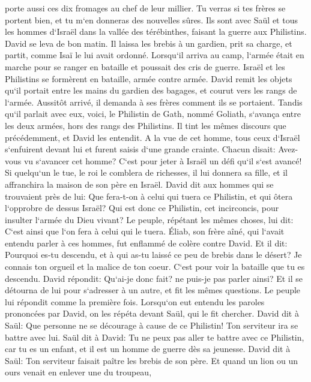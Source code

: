 \verse porte aussi ces dix fromages au chef de leur millier. Tu verras si tes frères se portent bien, et tu m`en donneras des nouvelles sûres. 
\verse Ils sont avec Saül et tous les hommes d`Israël dans la vallée des térébinthes, faisant la guerre aux Philistins. 
\verse David se leva de bon matin. Il laissa les brebis à un gardien, prit sa charge, et partit, comme Isaï le lui avait ordonné. Lorsqu`il arriva au camp, l`armée était en marche pour se ranger en bataille et poussait des cris de guerre. 
\verse Israël et les Philistins se formèrent en bataille, armée contre armée. 
\verse David remit les objets qu`il portait entre les mains du gardien des bagages, et courut vers les rangs de l`armée. Aussitôt arrivé, il demanda à ses frères comment ils se portaient. 
\verse Tandis qu`il parlait avec eux, voici, le Philistin de Gath, nommé Goliath, s`avança entre les deux armées, hors des rangs des Philistins. Il tint les mêmes discours que précédemment, et David les entendit. 
\verse A la vue de cet homme, tous ceux d`Israël s`enfuirent devant lui et furent saisis d`une grande crainte. 
\verse Chacun disait: Avez-vous vu s`avancer cet homme? C`est pour jeter à Israël un défi qu`il s`est avancé! Si quelqu`un le tue, le roi le comblera de richesses, il lui donnera sa fille, et il affranchira la maison de son père en Israël. 
\verse David dit aux hommes qui se trouvaient près de lui: Que fera-t-on à celui qui tuera ce Philistin, et qui ôtera l`opprobre de dessus Israël? Qui est donc ce Philistin, cet incirconcis, pour insulter l`armée du Dieu vivant? 
\verse Le peuple, répétant les mêmes choses, lui dit: C`est ainsi que l`on fera à celui qui le tuera. 
\verse Éliab, son frère aîné, qui l`avait entendu parler à ces hommes, fut enflammé de colère contre David. Et il dit: Pourquoi es-tu descendu, et à qui as-tu laissé ce peu de brebis dans le désert? Je connais ton orgueil et la malice de ton coeur. C`est pour voir la bataille que tu es descendu. 
\verse David répondit: Qu`ai-je donc fait? ne puis-je pas parler ainsi? 
\verse Et il se détourna de lui pour s`adresser à un autre, et fit les mêmes questions. Le peuple lui répondit comme la première fois. 
\verse Lorsqu`on eut entendu les paroles prononcées par David, on les répéta devant Saül, qui le fit chercher. 
\verse David dit à Saül: Que personne ne se décourage à cause de ce Philistin! Ton serviteur ira se battre avec lui. 
\verse Saül dit à David: Tu ne peux pas aller te battre avec ce Philistin, car tu es un enfant, et il est un homme de guerre dès sa jeunesse. 
\verse David dit à Saül: Ton serviteur faisait paître les brebis de son père. Et quand un lion ou un ours venait en enlever une du troupeau, 
